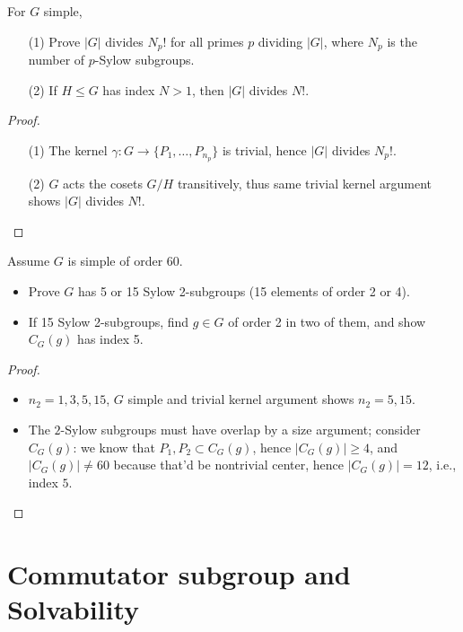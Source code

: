 \documentclass[openany]{book}
\begin{document}
\begin{prob}[2.23]
For \( G \) simple, 
\begin{itemize}
    \item[(1)] Prove \( |G| \) divides \( N_p! \) for all primes \( p \) dividing \( |G| \), where \( N_p \) is the number of \( p \)-Sylow subgroups. 
    \item[(2)] If \( H \leq G \) has index \( N > 1 \), then \( |G| \) divides \( N! \). 
\end{itemize}
\end{prob}
\begin{proof}
    \begin{itemize}
        \item[(1)] The kernel $\gamma: G \to \{P_1,\dots, P_{n_p}\}$ is trivial, hence $|G|$ divides $N_p!$.
        \item[(2)] $G$ acts the cosets $G/H$ transitively, thus same trivial kernel argument shows $|G|$ divides $N!$. 
    \end{itemize}
\end{proof}


\begin{prob}[2.25]
Assume \( G \) is simple of order 60.
\begin{itemize}
    \item Prove \( G \) has 5 or 15 Sylow 2-subgroups (15 elements of order 2 or 4).
    \item If 15 Sylow 2-subgroups, find \( g \in G \) of order 2 in two of them, and show \( C_G(g) \) has index 5.
\end{itemize}
\end{prob}
\begin{proof}
    \begin{itemize}
        \item $n_2=1,3,5,15$, $G$ simple and trivial kernel argument shows $n_2=5,15$.
        \item The $2$-Sylow subgroups must have overlap by a size argument; consider $C_G(g)$: we know that $P_1,P_2\subset C_G(g)$, hence $|C_G(g)|\geq 4$, and $|C_G(g)|\neq 60$ because that'd be nontrivial center, hence $|C_G(g)|=12$, i.e., index $5$.
    \end{itemize}
\end{proof}


\section{Commutator subgroup and Solvability}
\end{document}
